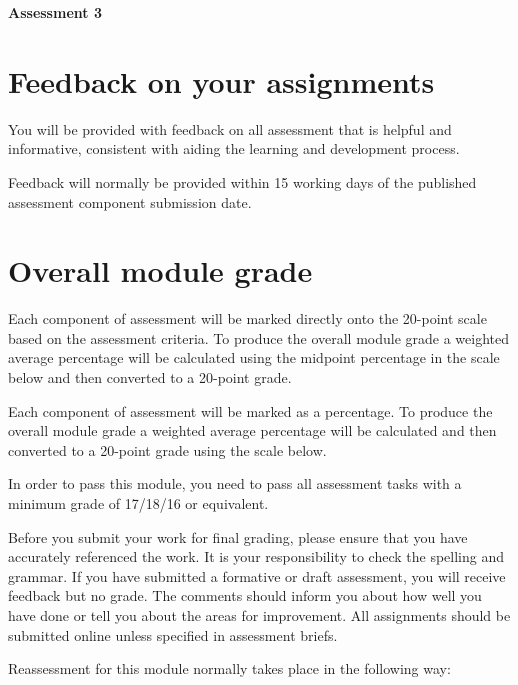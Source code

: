 \documentclass{MDXHandbook}
\begin{document}
\textbf{Assessment 3}

\section*{Feedback on your assignments}
You will be provided with feedback on all assessment that is helpful and informative, consistent with aiding the learning and development process. 

Feedback will normally be provided within 15 working days of the published assessment component submission date.

\section*{Overall module grade}

Each component of assessment will be marked directly onto the 20-point scale based on the assessment criteria. To produce the overall module grade a weighted average percentage will be calculated using the midpoint percentage in the scale below and then converted to a 20-point grade.


Each component of assessment will be marked as a percentage. To produce the overall module grade a weighted average percentage will be calculated and then converted to a 20-point grade using the scale below.


In order to pass this module, you need to pass all assessment tasks with a minimum grade of 17/18/16 or equivalent.

Before you submit your work for final grading, please ensure that you have accurately referenced the work.  It is your responsibility to check the spelling and grammar.  If you have submitted a formative or draft assessment, you will receive feedback but no grade. The comments should inform you about how well you have done or tell you about the areas for improvement. All assignments should be submitted online unless specified in assessment briefs.

Reassessment for this module normally takes place in the following way:
\end{document}

